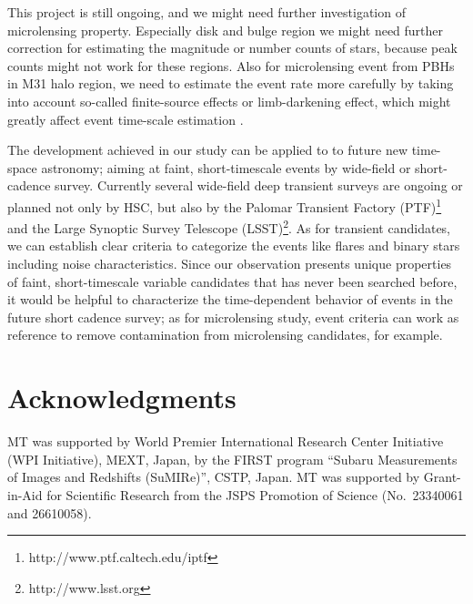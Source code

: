 \documentclass[iop, apj]{emulateapj}
\newcommand{\?}{\stackrel{?}{=}}
\begin{document}
This project is still ongoing, and we might need further investigation of microlensing property. 
Especially disk and bulge region we might need further correction for  
estimating the magnitude or number counts of stars, 
because peak counts might not work for these regions. 
Also for microlensing event from PBHs in M31 halo region, 
we need to estimate the event rate more carefully by taking into account 
so-called finite-source effects or limb-darkening effect, 
which might greatly affect event time-scale estimation \citep[see][for the detail]{Riffeseretal:08}. 


The development achieved in our study can be applied to 
to future new time-space astronomy; aiming at faint, short-timescale events by 
wide-field or short-cadence survey. 
Currently several wide-field deep transient surveys are ongoing or planned not only by HSC, but also by 
the Palomar Transient Factory (PTF)\footnote{http://www.ptf.caltech.edu/iptf} and 
the Large Synoptic Survey Telescope (LSST)\footnote{http://www.lsst.org}. 
As for transient candidates, we can establish clear criteria 
to categorize the events like flares and binary stars including noise characteristics.  
Since our observation presents unique properties of faint, short-timescale variable candidates  
that has never been searched before, 
it would be helpful to characterize the time-dependent behavior of events 
in the future short cadence survey; 
as for microlensing study, event criteria can work as reference to 
remove contamination from microlensing candidates, for example. 

\section*{Acknowledgments}

MT was supported by World Premier International Research Center
Initiative (WPI Initiative), MEXT, Japan, by the FIRST program ``Subaru
Measurements of Images and Redshifts (SuMIRe)'', CSTP, Japan. MT was supported 
by Grant-in-Aid for Scientific Research from the JSPS Promotion of Science
(No.~23340061 and 26610058). 











\clearpage
\end{document}
